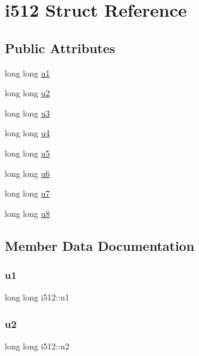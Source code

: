 \hypertarget{structi512}{}\section{i512 Struct Reference}
\label{structi512}
\subsection*{Public Attributes}
\begin{DoxyCompactItemize}
\item 
long long \mbox{\hyperlink{structi512_abf0a3e05da585210d7e05a3876204617}{u1}}
\item 
long long \mbox{\hyperlink{structi512_ae384a044e8fd4d178759111e9d028511}{u2}}
\item 
long long \mbox{\hyperlink{structi512_a7b2ebbb360de90c668e274edd520692f}{u3}}
\item 
long long \mbox{\hyperlink{structi512_aa5e15e0dd53281ce868369aba3d581a0}{u4}}
\item 
long long \mbox{\hyperlink{structi512_a47d6f0745ab48fc750cd71ff7f4873a2}{u5}}
\item 
long long \mbox{\hyperlink{structi512_a5336030da073415dcec8917195b3df81}{u6}}
\item 
long long \mbox{\hyperlink{structi512_a0cbf737ca442e08cabd22c1a475213b9}{u7}}
\item 
long long \mbox{\hyperlink{structi512_a4cb0de0ed4509aa1789db1a5568580f6}{u8}}
\end{DoxyCompactItemize}


\subsection{Member Data Documentation}
\mbox{\label{structi512_abf0a3e05da585210d7e05a3876204617}} 
\subsubsection{\texorpdfstring{u1}{u1}}
{\footnotesize\ttfamily long long i512\+::u1}

\mbox{\label{structi512_ae384a044e8fd4d178759111e9d028511}} 
\subsubsection{\texorpdfstring{u2}{u2}}
{\footnotesize\ttfamily long long i512\+::u2}

